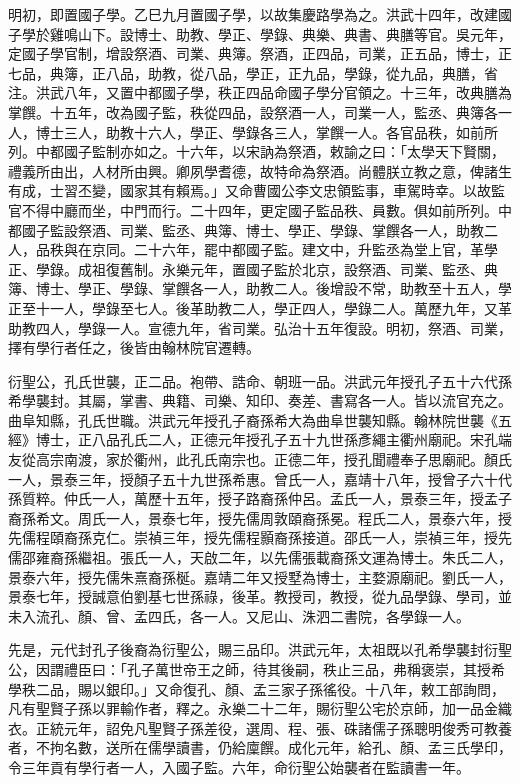 明初，即置國子學。乙巳九月置國子學，以故集慶路學為之。洪武十四年，改建國子學於雞鳴山下。設博士、助教、學正、學錄、典樂、典書、典膳等官。吳元年，定國子學官制，增設祭酒、司業、典簿。祭酒，正四品，司業，正五品，博士，正七品，典簿，正八品，助教，從八品，學正，正九品，學錄，從九品，典膳，省注。洪武八年，又置中都國子學，秩正四品命國子學分官領之。十三年，改典膳為掌饌。十五年，改為國子監，秩從四品，設祭酒一人，司業一人，監丞、典簿各一人，博士三人，助教十六人，學正、學錄各三人，掌饌一人。各官品秩，如前所列。中都國子監制亦如之。十六年，以宋訥為祭酒，敕諭之曰：「太學天下賢關，禮義所由出，人材所由興。卿夙學耆德，故特命為祭酒。尚體朕立教之意，俾諸生有成，士習丕變，國家其有賴焉。」又命曹國公李文忠領監事，車駕時幸。以故監官不得中廳而坐，中門而行。二十四年，更定國子監品秩、員數。俱如前所列。中都國子監設祭酒、司業、監丞、典簿、博士、學正、學錄、掌饌各一人，助教二人，品秩與在京同。二十六年，罷中都國子監。建文中，升監丞為堂上官，革學正、學錄。成祖復舊制。永樂元年，置國子監於北京，設祭酒、司業、監丞、典簿、博士、學正、學錄、掌饌各一人，助教二人。後增設不常，助教至十五人，學正至十一人，學錄至七人。後革助教二人，學正四人，學錄二人。萬歷九年，又革助教四人，學錄一人。宣德九年，省司業。弘治十五年復設。明初，祭酒、司業，擇有學行者任之，後皆由翰林院官遷轉。

衍聖公，孔氏世襲，正二品。袍帶、誥命、朝班一品。洪武元年授孔子五十六代孫希學襲封。其屬，掌書、典籍、司樂、知印、奏差、書寫各一人。皆以流官充之。曲阜知縣，孔氏世職。洪武元年授孔子裔孫希大為曲阜世襲知縣。翰林院世襲《五經》博士，正八品孔氏二人，正德元年授孔子五十九世孫彥繩主衢州廟祀。宋孔端友從高宗南渡，家於衢州，此孔氏南宗也。正德二年，授孔聞禮奉子思廟祀。顏氏一人，景泰三年，授顏子五十九世孫希惠。曾氏一人，嘉靖十八年，授曾子六十代孫質粹。仲氏一人，萬歷十五年，授子路裔孫仲呂。孟氏一人，景泰三年，授孟子裔孫希文。周氏一人，景泰七年，授先儒周敦頤裔孫冕。程氏二人，景泰六年，授先儒程頤裔孫克仁。崇禎三年，授先儒程顥裔孫接道。邵氏一人，崇禎三年，授先儒邵雍裔孫繼祖。張氏一人，天啟二年，以先儒張載裔孫文運為博士。朱氏二人，景泰六年，授先儒朱熹裔孫梴。嘉靖二年又授墅為博士，主婺源廟祀。劉氏一人，景泰七年，授誠意伯劉基七世孫祿，後革。教授司，教授，從九品學錄、學司，並未入流孔、顏、曾、孟四氏，各一人。又尼山、洙泗二書院，各學錄一人。

先是，元代封孔子後裔為衍聖公，賜三品印。洪武元年，太祖既以孔希學襲封衍聖公，因謂禮臣曰：「孔子萬世帝王之師，待其後嗣，秩止三品，弗稱褒崇，其授希學秩二品，賜以銀印。」又命復孔、顏、孟三家子孫徭役。十八年，敕工部詢問，凡有聖賢子孫以罪輸作者，釋之。永樂二十二年，賜衍聖公宅於京師，加一品金織衣。正統元年，詔免凡聖賢子孫差役，選周、程、張、硃諸儒子孫聰明俊秀可教養者，不拘名數，送所在儒學讀書，仍給廩饌。成化元年，給孔、顏、孟三氏學印，令三年貢有學行者一人，入國子監。六年，命衍聖公始襲者在監讀書一年。

